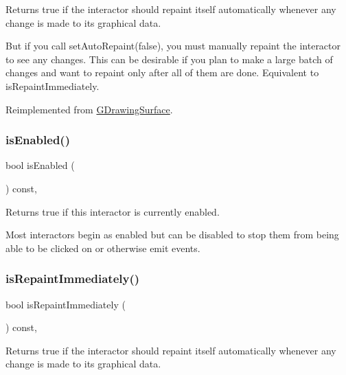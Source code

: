 Returns true if the interactor should repaint itself automatically whenever any change is made to its graphical data. 

But if you call set\+Auto\+Repaint(false), you must manually repaint the interactor to see any changes. This can be desirable if you plan to make a large batch of changes and want to repaint only after all of them are done. Equivalent to is\+Repaint\+Immediately. 

Reimplemented from \mbox{\hyperlink{classGDrawingSurface_a12c8d52ddfcaa5448ec4bace92ddee6c}{G\+Drawing\+Surface}}.

\mbox{\label{classGInteractor_aacb819fb241851fd9fc045271baa4034}} 
\subsubsection{\texorpdfstring{is\+Enabled()}{isEnabled()}}
{\footnotesize\ttfamily bool is\+Enabled (\begin{DoxyParamCaption}{ }\end{DoxyParamCaption}) const\hspace{0.3cm}{\ttfamily [virtual]}, {\ttfamily [inherited]}}



Returns true if this interactor is currently enabled. 

Most interactors begin as enabled but can be disabled to stop them from being able to be clicked on or otherwise emit events. \mbox{\label{classGDrawingSurface_a82a00267c81cc0ae85ee0feb01a92fa8}} 
\subsubsection{\texorpdfstring{is\+Repaint\+Immediately()}{isRepaintImmediately()}}
{\footnotesize\ttfamily bool is\+Repaint\+Immediately (\begin{DoxyParamCaption}{ }\end{DoxyParamCaption}) const\hspace{0.3cm}{\ttfamily [virtual]}, {\ttfamily [inherited]}}



Returns true if the interactor should repaint itself automatically whenever any change is made to its graphical data. 

